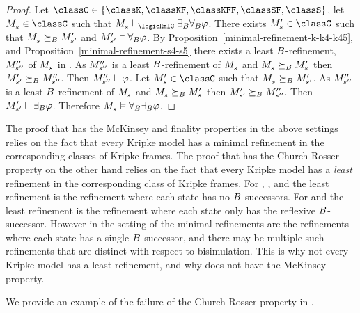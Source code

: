 \begin{proof}
Let $\classC \in \{\classK, \classKF, \classKFF, \classSF, \classS\}$, let $\kPModel{\kStateS} \in \classC$ such that $\kPModel{\kStateS} \entails_\logicRmlC \somerefsBs \allrefsBs \phi$.
There exists $\kPModelP{\kStateS} \in \classC$ such that $\kPModel{\kStateS} \simulatesBs \kPModelP{\kStateSP}$ and ${M^{\prime}_{{s}^{\prime}}} \vDash {\forall_{B}} \varphi$.
By Proposition~\ref{minimal-refinement-k-k4-k45}, and Proposition~\ref{minimal-refinement-s4-s5} there exists a least $B$-refinement, ${M^{\prime\prime}_{{s}^{\prime\prime}}}$ of $\kPModel{\kStateS}$ in \classS{}.
As ${M^{\prime\prime}_{{s}^{\prime\prime}}}$ is a least $B$-refinement of $\kPModel{\kStateS}$ and $\kPModel{\kStateS} \simulatesBs \kPModelP{\kStateS}$ then ${M^{\prime}_{{s}^{\prime}}} \succeq_{B} {M^{\prime\prime}_{{s}^{\prime\prime}}}$.
Then ${M^{\prime\prime}_{{s}^{\prime\prime}}} \vDash \varphi$.
Let $\kPModelP{\kStateS} \in \classC$ such that $\kPModel{\kStateS} \simulatesBs \kPModelP{\kStateSP}$.
As ${M^{\prime\prime}_{{s}^{\prime\prime}}}$ is a least $B$-refinement of $\kPModel{\kStateS}$ and $\kPModel{\kStateS} \simulatesBs \kPModelP{\kStateS}$ then ${M^{\prime}_{{s}^{\prime}}} \succeq_{B} {M^{\prime\prime}_{{s}^{\prime\prime}}}$.
Then ${M^{\prime}_{{s}^{\prime}}} \vDash {\exists_{B}} \varphi$.
Therefore $\kPModel{\kStateS} \entails \allrefsBs \somerefsBs \phi$.
\end{proof}

The proof that \logicRml{} has the McKinsey and finality properties in the above settings relies on the fact that every Kripke model has a minimal refinement in the corresponding classes of Kripke frames.
The proof that \logicRml{} has the Church-Rosser property on the other hand relies on the fact that every Kripke model has a {\em least} refinement in the corresponding class of Kripke frames.
For \classK{}, \classKF{}, and \classKFF{} the least refinement is the refinement where each state has no $B$-successors.
For \classSF{} and \classS{} the least refinement is the refinement where each state only has the reflexive $B$-successor.
However in the setting of \classKD{} the minimal refinements are the refinements where each state has a single $B$-successor, and there may be multiple such refinements that are distinct with respect to bisimulation.
This is why not every \classKD{} Kripke model has a least refinement, and why \logicRmlKD{} does not have the McKinsey property.

We provide an example of the failure of the Church-Rosser property in \logicRmlKD{}.

